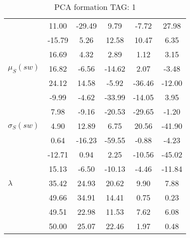 \begin{table}[h!]
\begin{center}
\begin{tabular}{| l || c | c | c | c | c |}
 & 11.00  & -29.49  & 9.79  & -7.72  & 27.98 \\
 & -15.79  & 5.26  & 12.58  & 10.47  & 6.35 \\
 & 16.69  & 4.32  & 2.89  & 1.12  & 3.15 \\\hline
$\mu_S(sw)$ & 16.82  & -6.56  & -14.62  & 2.07  & -3.48 \\
 & 24.12  & 14.58  & -5.92  & -36.46  & -12.00 \\
 & -9.99  & -4.62  & -33.99  & -14.05  & 3.95 \\
 & 7.98  & -9.16  & -20.53  & -29.65  & -1.20 \\\hline
$\sigma_S(sw)$ & 4.90  & 12.89  & 6.75  & 20.56  & -41.90 \\
 & 0.64  & -16.23  & -59.55  & -0.88  & -4.23 \\
 & -12.71  & 0.94  & 2.25  & -10.56  & -45.02 \\
 & 15.13  & -6.50  & -10.13  & -4.46  & -11.84 \\\hline\hline
$\lambda$ & 35.42  & 24.93  & 20.62  & 9.90  & 7.88 \\
 & 49.66  & 34.91  & 14.41  & 0.75  & 0.23 \\
 & 49.51  & 22.98  & 11.53  & 7.62  & 6.08 \\
 & 50.00  & 25.07  & 22.46  & 1.97  & 0.48 \\\hline
\end{tabular}
\caption{PCA formation TAG: 1}
\end{center}
\end{table}